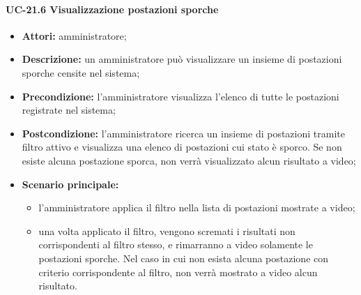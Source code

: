 \paragraph{UC-21.6 Visualizzazione postazioni sporche}
\begin{itemize}
    \item \textbf{Attori:} amministratore;
    \item \textbf{Descrizione:} un amministratore pu\`{o} visualizzare un insieme di postazioni sporche censite nel sistema;
    \item \textbf{Precondizione:} l'amministratore visualizza l'elenco di tutte le postazioni registrate nel sistema;
    \item \textbf{Postcondizione:} l'amministratore ricerca un insieme di postazioni tramite filtro attivo e visualizza una elenco di postazioni cui stato è sporco. Se non esiste alcuna postazione sporca, non verrà visualizzato alcun risultato a video;
    \item \textbf{Scenario principale:}
    \begin{itemize}
        \item l'amministratore applica il filtro nella lista di postazioni mostrate a video;
        \item una volta applicato il filtro, vengono scremati i risultati non corrispondenti al filtro stesso, e rimarranno a video solamente le postazioni sporche. Nel caso in cui non esista alcuna postazione con criterio corrispondente al filtro, non verrà mostrato a video alcun risultato.
    \end{itemize}
\end{itemize}

